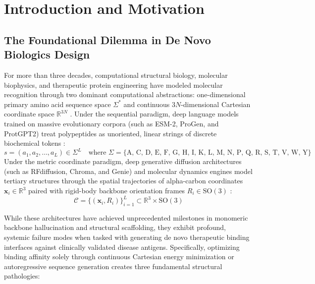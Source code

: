 \chapter{Introduction and Motivation}
\label{ch:intro}

\section{The Foundational Dilemma in De Novo Biologics Design}
\label{sec:biologics_dilemma}

For more than three decades, computational structural biology, molecular biophysics, and therapeutic protein engineering have modeled molecular recognition through two dominant computational abstractions: one-dimensional primary amino acid sequence space $\Sigma^*$ and continuous $3N$-dimensional Cartesian coordinate space $\mathbb{R}^{3N}$ \cite{jumper2021highly, watson2023novo}. Under the sequential paradigm, deep language models trained on massive evolutionary corpora (such as ESM-2, ProGen, and ProtGPT2) treat polypeptides as unoriented, linear strings of discrete biochemical tokens \cite{lin2023evolutionary}:
\begin{equation}
    s = (a_1, a_2, \dots, a_L) \in \Sigma^L \quad \text{where } \Sigma = \{ \text{A, C, D, E, F, G, H, I, K, L, M, N, P, Q, R, S, T, V, W, Y} \}
\end{equation}
Under the metric coordinate paradigm, deep generative diffusion architectures (such as RFdiffusion, Chroma, and Genie) and molecular dynamics engines model tertiary structures through the spatial trajectories of alpha-carbon coordinates $\mathbf{x}_i \in \mathbb{R}^3$ paired with rigid-body backbone orientation frames $R_i \in \mathrm{SO}(3)$ \cite{watson2023novo}:
\begin{equation}
    \mathcal{C} = \{ (\mathbf{x}_i, R_i) \}_{i=1}^L \subset \mathbb{R}^3 \times \mathrm{SO}(3)
\end{equation}

While these architectures have achieved unprecedented milestones in monomeric backbone hallucination and structural scaffolding, they exhibit profound, systemic failure modes when tasked with generating de novo therapeutic binding interfaces against clinically validated disease antigens. Specifically, optimizing binding affinity solely through continuous Cartesian energy minimization or autoregressive sequence generation creates three fundamental structural pathologies:

